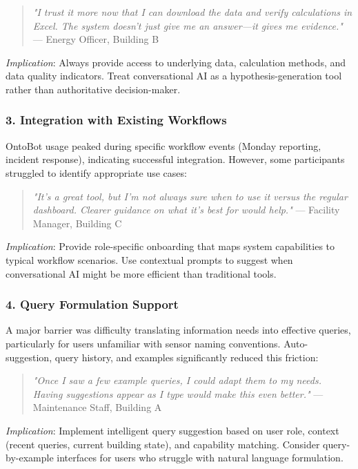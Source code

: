 \documentclass[acmlarge]{acmart}
\begin{document}
\begin{quote}
\textit{"I trust it more now that I can download the data and verify calculations in Excel. The system doesn't just give me an answer—it gives me evidence."} — Energy Officer, Building B
\end{quote}

\textit{Implication}: Always provide access to underlying data, calculation methods, and data quality indicators. Treat conversational AI as a hypothesis-generation tool rather than authoritative decision-maker.

\subsubsection{3. Integration with Existing Workflows}

OntoBot usage peaked during specific workflow events (Monday reporting, incident response), indicating successful integration. However, some participants struggled to identify appropriate use cases:

\begin{quote}
\textit{"It's a great tool, but I'm not always sure when to use it versus the regular dashboard. Clearer guidance on what it's best for would help."} — Facility Manager, Building C
\end{quote}

\textit{Implication}: Provide role-specific onboarding that maps system capabilities to typical workflow scenarios. Use contextual prompts to suggest when conversational AI might be more efficient than traditional tools.

\subsubsection{4. Query Formulation Support}

A major barrier was difficulty translating information needs into effective queries, particularly for users unfamiliar with sensor naming conventions. Auto-suggestion, query history, and examples significantly reduced this friction:

\begin{quote}
\textit{"Once I saw a few example queries, I could adapt them to my needs. Having suggestions appear as I type would make this even better."} — Maintenance Staff, Building A
\end{quote}

\textit{Implication}: Implement intelligent query suggestion based on user role, context (recent queries, current building state), and capability matching. Consider query-by-example interfaces for users who struggle with natural language formulation.
\end{document}
